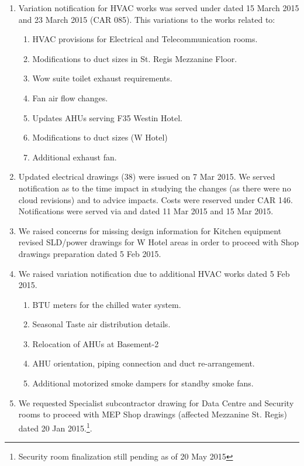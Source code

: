 \begin{enumerate}
\item Variation notification for HVAC works was served under  dated 15 March 2015 and 23 March 2015 (CAR 085). This variations to the works related to:
  \begin{enumerate}
	\item HVAC provisions for Electrical and Telecommunication rooms.
	\item Modifications to duct sizes in St. Regis Mezzanine Floor.
	\item Wow suite toilet exhaust requirements.
	\item Fan air flow changes.
	\item Updates AHUs serving F35 Westin Hotel.
	\item Modifications to duct sizes (W Hotel)
	\item Additional exhaust fan.
  \end{enumerate}
  
 \item Updated electrical drawings (38) were issued on 7 Mar 2015. We served notification as to the time impact in studying the changes (as there were no cloud revisions) and to advice impacts. Costs were reserved under CAR 146. Notifications were served via  and  dated 11 Mar 2015 and 15 Mar 2015.
 
 \item We raised concerns for missing design information for Kitchen equipment revised SLD/power drawings for W Hotel areas in order to proceed with Shop drawings preparation  dated 5 Feb 2015.
 
 \item We raised variation notification due to additional HVAC works  dated 5 Feb 2015.
       \begin{enumerate}
          \item BTU meters for the chilled water system.
          \item Seasonal Taste air distribution details.
          \item Relocation of AHUs at Basement-2
          \item AHU orientation, piping connection and duct re-arrangement.
          \item Additional motorized smoke dampers for standby smoke fans.
       \end{enumerate}

    
\item We requested Specialist subcontractor drawing for Data Centre and Security rooms  to proceed with MEP Shop drawings (affected Mezzanine St. Regis)  dated 20 Jan 2015.\footnote{Security room finalization still pending as of 20 May 2015}. 


\end{enumerate}
